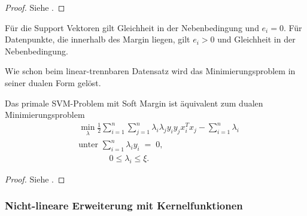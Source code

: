 \begin{proof}
	Siehe \cite{SVM}.
\end{proof}

\begin{bem}
	Für die Support Vektoren gilt Gleichheit in der Nebenbedingung und \(e_i=0\). Für Datenpunkte, die innerhalb des Margin liegen, gilt \(e_i>0\) und Gleichheit in der Nebenbedingung.
\end{bem}

Wie schon beim linear-trennbaren Datensatz wird das Minimierungsproblem in seiner dualen Form gelöst.

\begin{satz}
	Das primale SVM-Problem mit Soft Margin ist äquivalent zum dualen Minimierungsproblem
	\begin{align*}
		&\min_{\lambda} \frac{1}{2}\sum_{i=1}^{n}\sum_{j=1}^{n}\lambda_i\lambda_jy_iy_jx_i^Tx_j-\sum_{i=1}^{n}\lambda_i\\
		&\text{unter } \sum_{i=1}^{n}\lambda_iy_i\;=\;0,\\
		&\qquad\quad\:\:\: 0\leq\lambda_i\leq\xi.
	\end{align*}
\end{satz}

\begin{proof}
	Siehe \cite{SVM}.
\end{proof}

\subsubsection{Nicht-lineare Erweiterung mit Kernelfunktionen}

